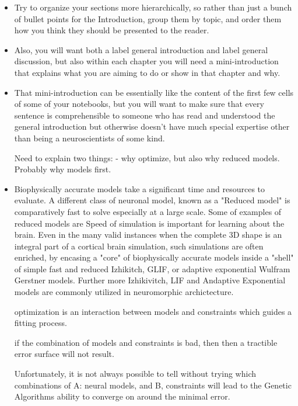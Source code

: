\documentclass{article}
\begin{document}
\begin{itemize}

\item  Try to organize your sections more hierarchically, so rather than just a bunch of bullet points for the Introduction, group them by topic, and order them how you think they should be presented to the reader.  

\item Also, you will want both a label general introduction and label general discussion, but also within each chapter you will need a mini-introduction that explains what you are aiming to do or show in that chapter and why. 

\item That mini-introduction can be essentially like the content of the first few cells of some of your notebooks, but you will want to make sure that every sentence is comprehensible to someone who has read and understood the general introduction but otherwise doesn’t have much special expertise other than being a neuroscientists of some kind.



Need to explain two things:
- why optimize, but also why reduced models. Probably why models first.

\item Biophysically accurate models take a significant time and resources to evaluate. A different class of neuronal model, known as a "Reduced model" is comparatively fast to solve especially at a large scale. Some of examples of reduced models are  Speed of simulation is important for learning about the brain. Even in the many valid instances when the complete 3D shape is an integral part of a cortical brain simulation, such simulations are often enriched, by encasing a "core" of biophysically accurate models inside a "shell" of simple fast and reduced Izhikitch, GLIF, or adaptive exponential Wulfram Gerstner models. Further more Izhikivitch, LIF and Andaptive Exponential models are commonly utilized in neuromorphic archictecture.


\subitem optimization is an interaction between models and constraints which guides a fitting process. 

\subitem if the combination of models and constraints is bad, then then a tractible error surface will not result.  

\subsubitem Unfortunately, it is not always possible to tell without trying which combinations of A: neural models, and B, constraints will lead to the Genetic Algorithms ability to converge on around the minimal error. 



\end{itemize}
\end{document}
